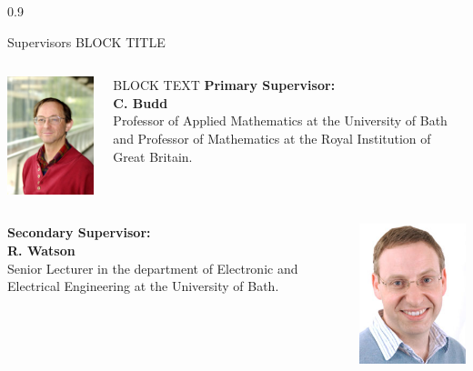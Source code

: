 \documentclass[final]{beamer}
\theoremstyle{plain}
\theoremstyle{definition}
\theoremstyle{remark}
\newlength{\onecolwid}
\begin{document}
\begin{frame}[t]
\begin{columns}[t]
\begin{column}{0.9\onecolwid}
\begin{block}{Supervisors BLOCK TITLE}
\vspace{-2cm}
\begin{columns}
\begin{column}{0.25\linewidth}
\includegraphics[scale=2.9]{chris-budd.jpg}
\end{column}
\begin{column}{0.75\linewidth}
BLOCK TEXT
\textbf{Primary Supervisor: \\ C. Budd}
 \\
Professor of Applied Mathematics at the University of Bath and Professor of Mathematics at the Royal Institution of Great Britain. \\
\end{column}
\end{columns}
\vspace{2cm}
\begin{columns}
\begin{column}{0.77\linewidth}
\textbf{Secondary Supervisor: \\ R. Watson}
 \\
Senior Lecturer in the department of Electronic and Electrical Engineering at the University of Bath. \\
\end{column}
\begin{column}{0.25\linewidth}
\includegraphics[scale=0.75]{RWatson.jpg}
\end{column}
\end{columns}
\end{block}
\vspace{1.75cm}


\end{column}
\end{columns}
\end{frame}
\end{document}
